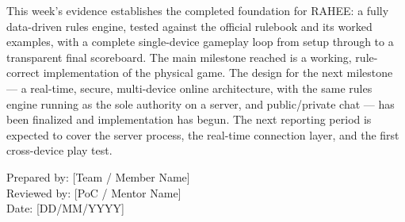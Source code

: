 \documentclass[11pt]{article}
\newcommand{\bracket}[1]{\textcolor{gray!70!black}{[#1]}}
\begin{document}
This week's evidence establishes the completed foundation for RAHEE: a fully data-driven rules engine, tested against the official rulebook and its worked examples, with a complete single-device gameplay loop from setup through to a transparent final scoreboard. The main milestone reached is a working, rule-correct implementation of the physical game. The design for the next milestone --- a real-time, secure, multi-device online architecture, with the same rules engine running as the sole authority on a server, and public/private chat --- has been finalized and implementation has begun. The next reporting period is expected to cover the server process, the real-time connection layer, and the first cross-device play test.

\vspace{18pt}
\noindent Prepared by: \bracket{Team / Member Name}\\
Reviewed by: \bracket{PoC / Mentor Name}\\
Date: \bracket{DD/MM/YYYY}
\end{document}
